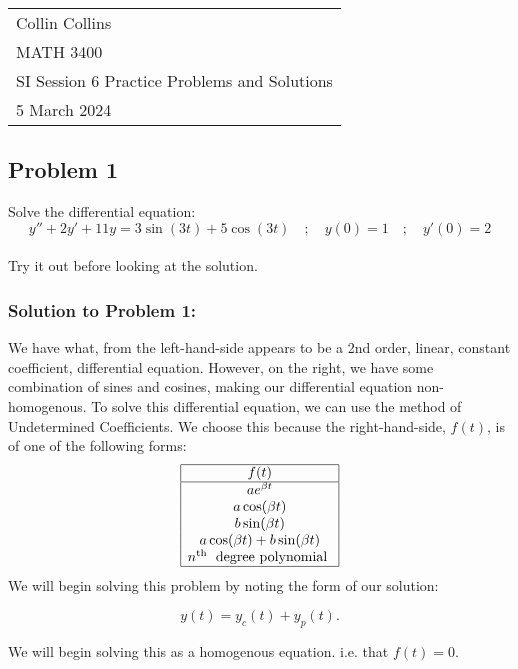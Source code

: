 \documentclass[a4paper,12pt]{article}
\begin{document}

\thispagestyle{empty}

\begin{tabular}{p{15.5cm}}
\\ Collin Collins \\
MATH 3400\\
SI Session 6 Practice Problems and Solutions\\
5 March 2024 \\
\hline

\end{tabular} 

\subsection*{Problem 1} Solve the differential equation:
$$ y'' + 2y' + 11y = 3\sin(3t) + 5\cos(3t) \quad ; \quad y(0)=1 \quad;\quad y'\left(0\right)=2 $$
\\
 
Try it out before looking at the solution.
\pagebreak
 
 \subsubsection*{Solution to Problem 1:}
 We have what, from the left-hand-side appears to be a 2nd order, linear, constant coefficient, differential equation. However, on the right, we have some combination of sines and cosines, making our differential equation non-homogenous. To solve this differential equation, we can use the method of Undetermined Coefficients. We choose this because the right-hand-side, $f(t)$, is of one of the following forms:
 $$ \begin{array}{|c|}
\hline f(t) \\
\hline a e^{\beta t} \\
a \cos (\beta t) \\
b \sin (\beta t) \\
a \cos (\beta t)+b \sin (\beta t) \\
n^{\text {th }} \text { degree polynomial } \\
\hline 
\end{array} $$
We will begin solving this problem by noting the form of our solution: 

$$ y(t) = y_c(t) + y_p(t). $$

We will begin solving this as a homogenous equation. i.e. that $f(t)=0.$
\end{document}
